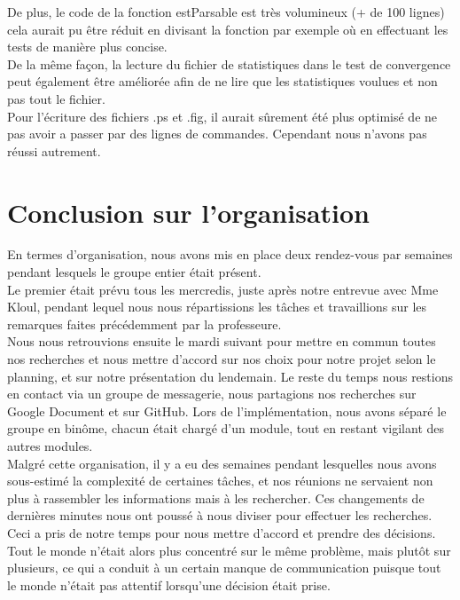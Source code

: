 \documentclass[a4paper,11pt]{article}
\begin{document}
		De plus, le code de la fonction estParsable est très volumineux (+ de 100 lignes) cela aurait pu être réduit en divisant la fonction par exemple où en effectuant les tests de manière plus concise.\\
		De la même façon, la lecture du fichier de statistiques dans le test de convergence peut également être améliorée afin de ne lire que les statistiques voulues et non pas tout le fichier.\\
		Pour l'écriture des fichiers .ps et .fig, il aurait sûrement été plus optimisé de ne pas avoir a passer par des lignes de commandes. Cependant nous n’avons pas réussi autrement.\\

	\section{Conclusion sur l'organisation}
		En termes d’organisation, nous avons mis en place deux rendez-vous par semaines pendant lesquels le groupe entier était présent.\\
		Le premier était prévu tous les mercredis, juste après notre entrevue avec Mme Kloul, pendant lequel nous nous répartissions les tâches et travaillions sur les remarques faites précédemment par la professeure.\\
		Nous nous retrouvions ensuite le mardi suivant pour mettre en commun toutes nos recherches et nous mettre d’accord sur nos choix pour notre projet selon le planning, et sur notre présentation du lendemain. Le reste du temps nous restions en contact via un groupe de messagerie, nous partagions nos recherches sur Google Document et sur GitHub. Lors de l’implémentation, nous avons séparé le groupe en binôme, chacun était chargé d’un module, tout en restant vigilant des autres modules.\\
		Malgré cette organisation, il y a eu des semaines pendant lesquelles nous avons sous-estimé la complexité de certaines tâches, et nos réunions ne servaient non plus à rassembler les informations mais à les rechercher. Ces changements de dernières minutes nous ont poussé à nous diviser pour effectuer les recherches. Ceci a pris de notre temps pour nous mettre d’accord et prendre des décisions.\\
		Tout le monde n’était alors plus concentré sur le même problème, mais plutôt sur plusieurs, ce qui a conduit à un certain manque de communication puisque tout le monde n’était pas attentif lorsqu’une décision était prise.\\
\end{document}
